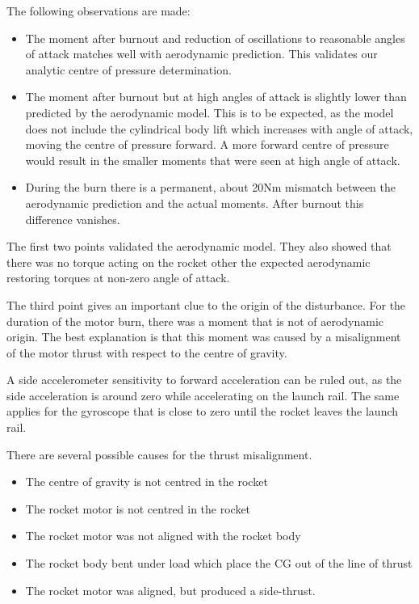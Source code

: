 The following observations are made:
\begin{itemize}
\item The moment after burnout and reduction of oscillations to reasonable angles of attack matches well with aerodynamic prediction. This validates our analytic centre of pressure determination.
\item The moment after burnout but at high angles of attack is slightly lower than predicted by the aerodynamic model. This is to be expected, as the model does not include the cylindrical body lift which increases with angle of attack, moving the centre of pressure forward. A more forward centre of pressure would result in the smaller moments that were seen at high angle of attack.
\item During the burn there is a permanent, about 20Nm mismatch between the aerodynamic prediction and the actual moments. After burnout this difference vanishes.
\end{itemize}

The first two points validated the aerodynamic model.
They also showed that there was no torque acting on the rocket other the expected aerodynamic restoring torques at non-zero angle of attack.

The third point gives an important clue to the origin of the disturbance. For the duration of the motor burn, there was a moment that is not of aerodynamic origin.
The best explanation is that this moment was caused by a misalignment of the motor thrust with respect to the centre of gravity.

A side accelerometer sensitivity to forward acceleration can be ruled out, as the side acceleration is around zero while accelerating on the launch rail.
The same applies for the gyroscope that is close to zero until the rocket leaves the launch rail.

There are several possible causes for the thrust misalignment.
\begin{itemize}
    \item The centre of gravity is not centred in the rocket
    \item The rocket motor is not centred in the rocket
    \item The rocket motor was not aligned with the rocket body
    \item The rocket body bent under load which place the CG out of the line of thrust
    \item The rocket motor was aligned, but produced a side-thrust.
\end{itemize}

